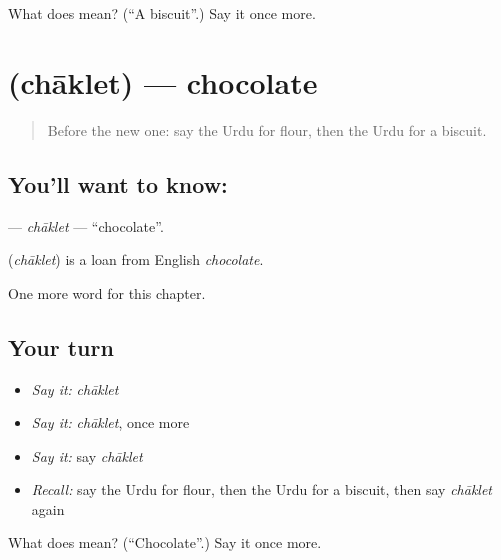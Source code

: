\begin{tcolorbox}[breakable,colback=teal!4,colframe=teal!35!black,title={Before you move on}]
What does  mean? (\textquotedblleft{}A biscuit\textquotedblright{}.) Say it once more.
\end{tcolorbox}
\section[\texorpdfstring{\ur{چاکلیٹ} (chāklet)}{چاکلیٹ (chāklet)}]{ (chāklet) — chocolate}

\label{lesson:UR-C118-chaklet}



\begin{quote}
Before the new one: say the Urdu for flour, then the Urdu for a biscuit.
\end{quote}

\subsection*{You'll want to know: }
\textbf{} — \emph{chāklet} — \textquotedblleft{}chocolate\textquotedblright{}.

\begin{cousinweb}
\textbf{} (\emph{chāklet}) is a loan from English \emph{chocolate}.
\end{cousinweb}

\begin{grammarlens}[title={What you've built}]
One more word for this chapter.
\end{grammarlens}

\subsection*{Your turn}
\begin{itemize}
\raggedright
  \item \emph{Say it:} \emph{chāklet}
  \item \emph{Say it:} \emph{chāklet}, once more
  \item \emph{Say it:} say \emph{chāklet}
  \item \emph{Recall:} say the Urdu for flour, then the Urdu for a biscuit, then say \emph{chāklet} again
\end{itemize}

\begin{tcolorbox}[breakable,colback=teal!4,colframe=teal!35!black,title={Before you move on}]
What does  mean? (\textquotedblleft{}Chocolate\textquotedblright{}.) Say it once more.
\end{tcolorbox}
